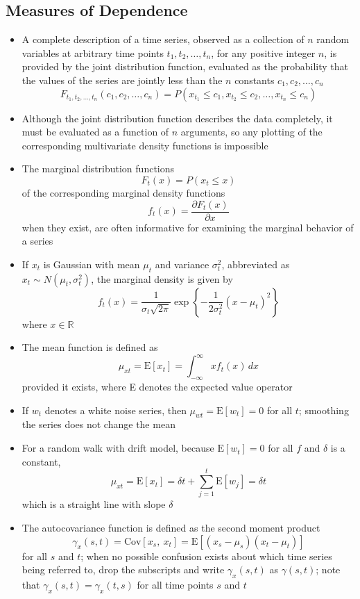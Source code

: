 \documentclass[12pt]{article}
\newcommand{\expe}[1]{\text{E}\left[ #1 \right]}
\newcommand{\cov}[2]{\text{Cov}\left[#1, ~#2\right]}
\begin{document}
\subsection{Measures of Dependence}
\begin{itemize}
\item A complete description of a time series, observed as a collection of $n$ random variables at arbitrary time points $t_1,t_2,\dots,t_n$, for any positive integer $n$, is provided by the joint distribution function, evaluated as the probability that the values of the series are jointly less than the $n$ constants $c_1,c_2,\dots,c_n$ $$ F_{t_1,t_2,\dots,t_n}(c_1,c_2,\dots,c_n) = P(x_{t_1} \leq c_1, x_{t_2} \leq c_2, \dots, x_{t_n} \leq c_n) $$ 
\item Although the joint distribution function describes the data completely, it must be evaluated as a function of $n$ arguments, so any plotting of the corresponding multivariate density functions is impossible
\item The marginal distribution functions $$ F_t(x) = P(x_t \leq x) $$ of the corresponding marginal density functions $$ f_t(x) = \frac{\partial F_t(x)}{\partial x} $$ when they exist, are often informative for examining the marginal behavior of a series 
\item If $x_t$ is Gaussian with mean $\mu_t$ and variance $\sigma^2_t$, abbreviated as $x_t \sim N(\mu_t, \sigma^2_t)$, the marginal density is given by $$ f_t(x) = \frac{1}{\sigma_t \sqrt{2\pi}} \exp\left\{ -\frac{1}{2\sigma^2_t}(x-\mu_t)^2\right\}$$ where $x \in \mathbb{R}$ 
\item The mean function is defined as $$ \mu_{xt} = \expe{x_t} = \int_{-\infty}^\infty xf_t(x) \, dx $$ provided it exists, where E denotes the expected value operator 
\item If $w_t$ denotes a white noise series, then $\mu_{wt} = \expe{w_t} = 0$ for all $t$; smoothing the series does not change the mean
\item For a random walk with drift model, because $\expe{w_t} = 0$ for all $f$ and $\delta$ is a constant, $$ \mu_{xt} = \expe{x_t} = \delta t + \sum_{j=1}^t \expe{w_j} = \delta t $$ which is a straight line with slope $\delta$ 
\item The autocovariance function is defined as the second moment product $$\gamma_x(s,t) = \cov{x_s}{x_t} = \expe{(x_s - \mu_s)(x_t - \mu_t)} $$ for all $s$ and $t$; when no possible confusion exists about which time series being referred to, drop the subscripts and write $\gamma_x(s,t)$ as $\gamma(s,t)$; note that $\gamma_x(s,t) = \gamma_x(t,s)$ for all time points $s$ and $t$ 

\end{itemize}
\end{document}
